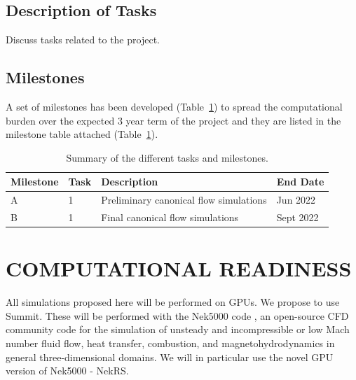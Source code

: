 \documentclass[11pt,letterpaper,english]{article}
\begin{document}
\vspace{-.25in}
\subsection{Description of Tasks}
\vspace{-.2in}

Discuss tasks related to the project.

\vspace{-.25in}
\subsection{Milestones}
\vspace{-.2in}

A set of milestones has been developed (Table~\ref{tab:milestones}) to spread the computational burden over
the expected 3 year term of the project and they are listed in the milestone table attached (Table~\ref{tab:milestones}).

\begin{table}
\centering
\caption{Summary of the different tasks and milestones.}
\begin{tabular}{llll}
\hline
\hline
Milestone & Task & Description & End Date \\
\hline
\hline
A & 1 & Preliminary canonical flow simulations   & Jun  2022 \\
B & 1 & Final canonical flow simulations         & Sept 2022 \\
\hline
\hline
\end{tabular}
\label{tab:milestones}
\end{table}

\vspace{-.25in}
\section{COMPUTATIONAL READINESS}
\vspace{-.2in}

All simulations proposed here will be performed on GPUs. We propose to use
Summit.  These will be performed with the Nek5000 code
\cite{argonne:nekdoc}, an open-source CFD  community code for the simulation of
unsteady and incompressible or low Mach number fluid flow, heat transfer,
combustion, and magnetohydrodynamics in general three-dimensional domains. We
will in particular use the novel GPU version of Nek5000 - NekRS.
\end{document}
